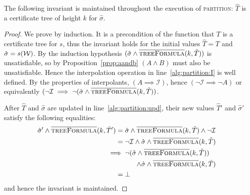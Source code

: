 \begin{proposition}
    The following invariant is maintained throughout the execution of \textsc{partition}: $\hat{T}$ is a certificate tree of height $k$ for $\hat{\sigma}$.
\end{proposition}
\begin{proof}
    We prove by induction. It is a precondition of the function that $T$ is a certificate tree for $s$, thus the invariant holds for the initial values $\hat{T} = T$ and $\hat{\sigma} = s(\mathcal{W})$.  By the induction hypothesis $(\hat{\sigma} \land \textsc{$\overline{\mbox{treeFormula}}$}(k, \hat{T}))$ is unsatisfiable, so by Proposition~\ref{prop:aandb} $(A \land B)$ must also be unsatisfiable.  Hence the interpolation operation in line~\ref{alg:partition:I} is well defined.  By the properties of interpolants, $(A \implies \mathcal{I})$, hence $(\neg \mathcal{I} \implies \neg A)$ or equivalently $(\neg\mathcal{I} \implies \neg (\hat{\sigma} \land \textsc{$\overline{\mbox{treeFormula}}$}(k, \tilde{T}))$.

    After $\hat{T}$ and $\hat{\sigma}$ are updated in line~\ref{alg:partition:upd}, their new values $\hat{T}'$ and $\hat{\sigma}'$ satisfy the following equalities: \begin{align*}
        \hat{\sigma}' \land \opptf(k, \hat{T}') ={}& \hat{\sigma} \land \opptf(k, \tilde{T}) \land \neg\mathcal{I} \\
        ={}& \neg\mathcal{I} \land \hat{\sigma} \land \opptf(k, \tilde{T}) \\
        \implies{}& \neg (\hat{\sigma} \land \opptf(k, \tilde{T})) \\
                  & \pushright{\land \hat{\sigma} \land \opptf(k, \tilde{T})} \\
        ={}& \bot
\end{align*} and hence the invariant is maintained.
\end{proof}

